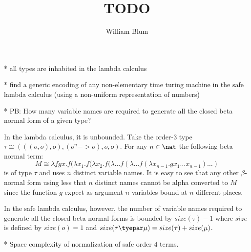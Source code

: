 \documentclass{article}
\title{TODO}
\author{William Blum}
\begin{document}
\maketitle

* all types are inhabited in the lambda calculus

* find a generic encoding of any non-elementary time turing machine
in the safe lambda calculus (using a non-uniform representation of
numbers)

* PB: How many variable names are required to generate all the
closed beta normal form of a given type?

In the lambda calculus, it is unbounded. Take the order-3 type $\tau
\cong (((o,o),o), (o^n->o), o, o)$. For any $n\in\nat$ the following
beta normal term:
$$ M \cong \lambda f g x . f (\lambda x_1.f(\lambda x_2.f(\lambda \ldots f(\lambda \ldots f(\lambda x_{n-1}.g x_1 \ldots x_{n-1}) \ldots )$$
is of type $\tau$ and uses $n$ distinct variable names. It is easy to see that
any other $\beta$-normal form using less that $n$ distinct names cannot be alpha converted to $M$
since the function $g$ expect as argument $n$ variables bound at $n$ different places.


In the safe lambda calculus, however, the number of variable names required to generate
all the closed beta normal forms is bounded by $size(\tau)-1$ where $size$ is defined by
$size(o)= 1$ and $size(\tau\tyepar\mu) = size(\tau) + size(\mu)$.

* Space complexity of normalization of safe order 4 terms.
\end{document}
